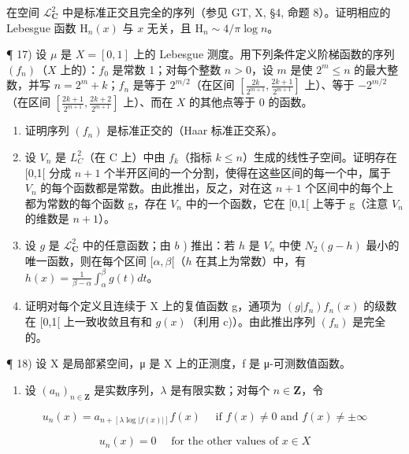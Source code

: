 在空间 \(\mathcal{L}_{\mathbf{C}}^{2}\) 中是标准正交且完全的序列（参见 GT, X, §4, 命题 8）。证明相应的 Lebesgue 函数 \(\mathrm{H}_n(x)\) 与 \(x\) 无关，且 \(\mathrm{H}_n \sim 4 / \pi \log n\)。

¶ 17) 设 \(\mu\) 是 \(X = [0,1]\) 上的 Lebesgue 测度。用下列条件定义阶梯函数的序列 \((f_n)\)（\(X\) 上的）：\(f_0\) 是常数 1；对每个整数 \(n > 0\)，设 \(m\) 是使 \(2^m \leqslant n\) 的最大整数，并写 \(n = 2^m + k\)；\(f_n\) 是等于 \(2^{m/2}\)（在区间 \(\left[\frac{2k}{2^{m+1}}, \frac{2k+1}{2^{m+1}}\right]\) 上）、等于 \(-2^{m/2}\)（在区间 \(\left[\frac{2k+1}{2^{m+1}}, \frac{2k+2}{2^{m+1}}\right]\) 上）、而在 \(X\) 的其他点等于 0 的函数。

\begin{enumerate}
\def\labelenumi{\alph{enumi})}
\item
  证明序列 \((f_n)\) 是标准正交的（Haar 标准正交系）。
\item
  设 \(V_{n}\) 是 \(L_{C}^{2}\)（在 C 上）中由 \(f_{k}\)（指标 \(k \leqslant n\)）生成的线性子空间。证明存在 {[}0,1{[} 分成 \(n+1\) 个半开区间的一个分割，使得在这些区间的每一个中，属于 \(V_{n}\) 的每个函数都是常数。由此推出，反之，对在这 \(n+1\) 个区间中的每个上都为常数的每个函数 g，存在 \(V_{n}\) 中的一个函数，它在 {[}0,1{[} 上等于 g（注意 \(V_{n}\) 的维数是 \(n+1\)）。
\item
  设 \(g\) 是 \(\mathcal{L}_{\mathbf{C}}^2\) 中的任意函数；由 \(b\) ) 推出：若 \(h\) 是 \(V_n\) 中使 \(N_2(g - h)\) 最小的唯一函数，则在每个区间 \([\alpha, \beta[\)（\(h\) 在其上为常数）中，有 \(h(x) = \frac{1}{\beta - \alpha} \int_{\alpha}^{\beta} g(t) dt\)。
\item
  证明对每个定义且连续于 X 上的复值函数 g，通项为 \((g|f_{n})f_{n}(x)\) 的级数在 {[}0,1{[} 上一致收敛且有和 \(g(x)\)（利用 c)）。由此推出序列 \((f_{n})\) 是完全的。
\end{enumerate}

¶ 18) 设 X 是局部紧空间，μ 是 X 上的正测度，f 是 μ-可测数值函数。

\begin{enumerate}
\def\labelenumi{\alph{enumi})}
\tightlist
\item
  设 \((a_{n})_{n\in \mathbf{Z}}\) 是实数序列，\(\lambda\) 是有限实数；对每个 \(n\in \mathbf{Z}\)，令
\end{enumerate}

\[
u _ {n} (x) = a _ {n + [ \lambda \log | f (x) | ]} f (x) \quad \text { if } f (x) \neq 0 \text { and } f (x) \neq \pm \infty
\]

\[
u _ {n} (x) = 0 \quad \text {   for   the   other   values   of   } x \in X
\]


